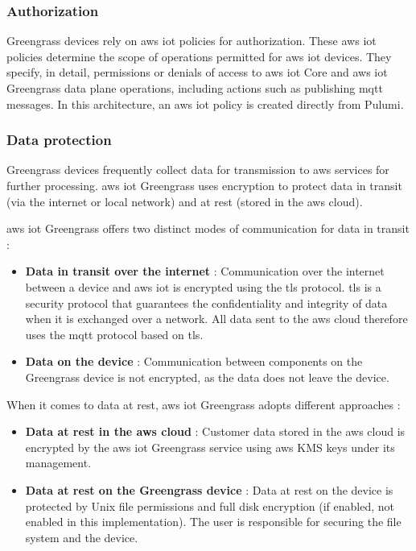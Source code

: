 \subsubsection{Authorization}
Greengrass devices rely on \gls{aws} \acrshort{iot} policies for authorization. These \gls{aws} \acrshort{iot} policies determine the scope of operations permitted for \gls{aws} \acrshort{iot} devices. They specify, in detail, permissions or denials of access to \gls{aws} \acrshort{iot} Core and \gls{aws} \acrshort{iot} Greengrass data plane operations, including actions such as publishing \acrshort{mqtt} messages. In this architecture, an \gls{aws} \acrshort{iot} policy is created directly from Pulumi. \cite{aws_iot_greengrass_security}

\subsubsection{Data protection}
Greengrass devices frequently collect data for transmission to \gls{aws} services for further processing. \gls{aws} \acrshort{iot} Greengrass uses encryption to protect data in transit (via the internet or local network) and at rest (stored in the \gls{aws} \gls{cloud}). \cite{aws_iot_greengrass_security}

\gls{aws} \acrshort{iot} Greengrass offers two distinct modes of communication for data in transit :
\begin{itemize}
    \item \textbf{Data in transit over the internet} : Communication over the internet between a device and \gls{aws} \acrshort{iot} is encrypted using the \acrfull{tls} protocol. \acrshort{tls} is a security protocol that guarantees the confidentiality and integrity of data when it is exchanged over a network. All data sent to the \gls{aws} \gls{cloud} therefore uses the \acrshort{mqtt} protocol based on \acrshort{tls}.
    \item \textbf{Data on the device} : Communication between components on the Greengrass device is not encrypted, as the data does not leave the device.
\end{itemize}

When it comes to data at rest, \gls{aws} \acrshort{iot} Greengrass adopts different approaches :
\begin{itemize}
    \item \textbf{Data at rest in the \gls{aws} \gls{cloud}} : Customer data stored in the \gls{aws} \gls{cloud} is encrypted by the \gls{aws} \acrshort{iot} Greengrass service using \gls{aws} KMS keys under its management.
    \item \textbf{Data at rest on the Greengrass device} : Data at rest on the device is protected by Unix file permissions and full disk encryption (if enabled, not enabled in this implementation). The user is responsible for securing the file system and the device.
\end{itemize}

